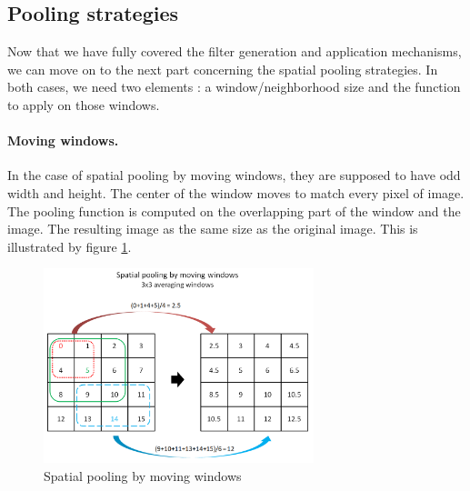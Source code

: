 \documentclass[a4paper]{report}
\begin{document}
		\subsection{Pooling strategies}
		Now that we have fully covered the filter generation and application mechanisms, we can move on to the next part concerning the spatial pooling strategies. In both cases, we need two elements : a window/neighborhood size and the function to apply on those windows.
			\paragraph{Moving windows.}
			In the case of spatial pooling by moving windows, they are supposed to have odd width and height. The center of the window moves to match every pixel of image. The pooling function is computed on the overlapping part of the window and the image. The resulting image as the same size as the original image. This is illustrated by figure \ref{fig:PoolMW}. 
	\begin{figure}
		\centering
			\includegraphics[width=0.7\textwidth]{images/PoolMW.png}
		\caption{\label{fig:PoolMW}Spatial pooling by moving windows}
	\end{figure}
			
\end{document}
